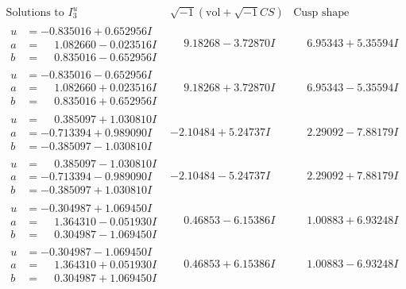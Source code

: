 \documentclass[1p]{elsarticle_modified}
\theoremstyle{definition}
\newcommand{\I}{\sqrt{-1}}
\begin{document}
$$\begin{array}{c|c|c}  
\text{Solutions to }I^u_{3}& \I (\text{vol} + \sqrt{-1}CS) & \text{Cusp shape}\\
 \hline 
\begin{aligned}
u &= -0.835016 + 0.652956 I \\
a &= \phantom{-}1.082660 - 0.023516 I \\
b &= \phantom{-}0.835016 - 0.652956 I\end{aligned}
 & \phantom{-}9.18268 - 3.72870 I & \phantom{-}6.95343 + 5.35594 I \\ \hline\begin{aligned}
u &= -0.835016 - 0.652956 I \\
a &= \phantom{-}1.082660 + 0.023516 I \\
b &= \phantom{-}0.835016 + 0.652956 I\end{aligned}
 & \phantom{-}9.18268 + 3.72870 I & \phantom{-}6.95343 - 5.35594 I \\ \hline\begin{aligned}
u &= \phantom{-}0.385097 + 1.030810 I \\
a &= -0.713394 + 0.989090 I \\
b &= -0.385097 - 1.030810 I\end{aligned}
 & -2.10484 + 5.24737 I & \phantom{-}2.29092 - 7.88179 I \\ \hline\begin{aligned}
u &= \phantom{-}0.385097 - 1.030810 I \\
a &= -0.713394 - 0.989090 I \\
b &= -0.385097 + 1.030810 I\end{aligned}
 & -2.10484 - 5.24737 I & \phantom{-}2.29092 + 7.88179 I \\ \hline\begin{aligned}
u &= -0.304987 + 1.069450 I \\
a &= \phantom{-}1.364310 - 0.051930 I \\
b &= \phantom{-}0.304987 - 1.069450 I\end{aligned}
 & \phantom{-}0.46853 - 6.15386 I & \phantom{-}1.00883 + 6.93248 I \\ \hline\begin{aligned}
u &= -0.304987 - 1.069450 I \\
a &= \phantom{-}1.364310 + 0.051930 I \\
b &= \phantom{-}0.304987 + 1.069450 I\end{aligned}
 & \phantom{-}0.46853 + 6.15386 I & \phantom{-}1.00883 - 6.93248 I \\ \hline\begin{aligned}

\end{aligned}
\end{array}$$
\end{document}
